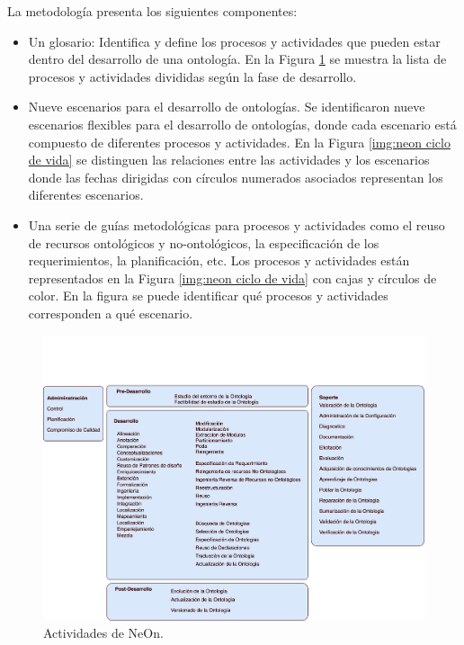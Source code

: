 La metodología presenta los siguientes componentes:
\begin{itemize}
    \item Un glosario: Identifica y define los procesos y actividades que pueden estar dentro del desarrollo de una ontología. En la Figura \ref{img:neon actividades} se muestra la lista de procesos y actividades divididas según la fase de desarrollo.
    \item Nueve escenarios para el desarrollo de ontologías. Se identificaron nueve escenarios flexibles para el desarrollo de ontologías, donde cada escenario está compuesto de diferentes procesos y actividades. En la Figura \ref{img:neon ciclo de vida} se distinguen las relaciones entre las actividades y los escenarios donde las fechas dirigidas con círculos numerados asociados representan los diferentes escenarios. 
    \item Una serie de guías metodológicas para procesos y actividades como el reuso de recursos ontológicos y no-ontológicos, la especificación de los requerimientos, la planificación, etc. Los procesos y actividades están representados en la Figura \ref{img:neon ciclo de vida} con cajas y círculos de color. En la figura se puede identificar qué procesos y actividades corresponden a qué escenario.
\end{itemize}

\begin{figure}[h!]
    \centering
    \includegraphics[width=150mm]{figuras/Diagramas-NeonActivities}
    \caption{Actividades de NeOn. \cite{SurezFigueroa2017Chapter2T}}
    \label{img:neon actividades}
    \end{figure}

